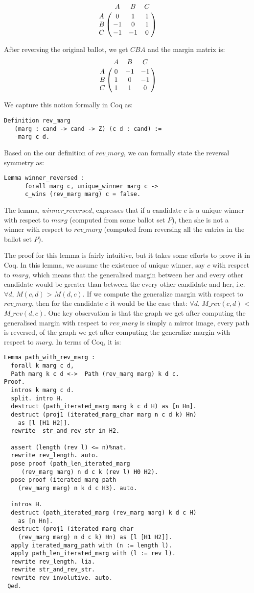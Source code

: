 \[
\bordermatrix{ & A & B & C \cr
      A & 0 & 1 & 1 \cr
      B & -1 & 0 & 1 \cr
      C & -1 & -1 & 0 }
      \]
      
After reversing the original ballot, we get $CBA$ and the margin matrix is:
\[
\bordermatrix{ & A & B & C \cr
      A & 0 & -1 & -1 \cr
      B & 1 & 0 & -1 \cr
      C & 1 & 1 & 0 }
      \]

We capture this notion formally in Coq as:

\begin{verbatim}
Definition rev_marg 
   (marg : cand -> cand -> Z) (c d : cand) :=
   -marg c d.
\end{verbatim}

Based on the our definition of $rev\_marg$, we can formally state the reversal symmetry as:
\begin{verbatim}
Lemma winner_reversed :
      forall marg c, unique_winner marg c ->
      c_wins (rev_marg marg) c = false.
\end{verbatim}

The lemma, $winner\_reversed$, expresses that if a candidate $c$ is a unique winner 
with respect to $marg$ (computed from some ballot set $P$), then she is not a winner with respect 
to $rev\_marg$ (computed from reversing all the entries in the ballot set $P$).


The proof for this lemma is fairly intuitive, but it takes some efforts to prove it in Coq. 
In this lemma, we assume the 
existence of unique winner, say $c$ with respect to $marg$, which means that the generalised
margin between her and every other candidate would be greater than 
between the every other candidate and her, i.e.  $\forall d$, $M (c, d)$ > $M (d, c)$. 
If we compute the generalize margin with respect to $rev\_marg$, then 
for the candidate $c$ it would be the case that:  
$\forall d$, $M\_rev (c, d)$ <  $M\_rev (d, c)$. 
One key observation is that the graph we get after computing the generalised margin with respect to $rev\_marg$ is 
simply a mirror image, every path is reversed, of the graph we get after computing the generalize margin with respect to $marg$. 
In terms of Coq, it is:
\begin{verbatim}
Lemma path_with_rev_marg :
  forall k marg c d,
  Path marg k c d <->  Path (rev_marg marg) k d c.
Proof.
  intros k marg c d.
  split. intro H. 
  destruct (path_iterated_marg marg k c d H) as [n Hn].
  destruct (proj1 (iterated_marg_char marg n c d k) Hn) 
    as [l [H1 H2]].
  rewrite  str_and_rev_str in H2.

  assert (length (rev l) <= n)%nat.
  rewrite rev_length. auto.
  pose proof (path_len_iterated_marg 
     (rev_marg marg) n d c k (rev l) H0 H2).
  pose proof (iterated_marg_path 
    (rev_marg marg) n k d c H3). auto. 
      
  intros H. 
  destruct (path_iterated_marg (rev_marg marg) k d c H) 
    as [n Hn].  
  destruct (proj1 (iterated_marg_char 
    (rev_marg marg) n d c k) Hn) as [l [H1 H2]].
  apply iterated_marg_path with (n := length l).
  apply path_len_iterated_marg with (l := rev l).
  rewrite rev_length. lia. 
  rewrite str_and_rev_str.
  rewrite rev_involutive. auto.
 Qed.
    
\end{verbatim}

